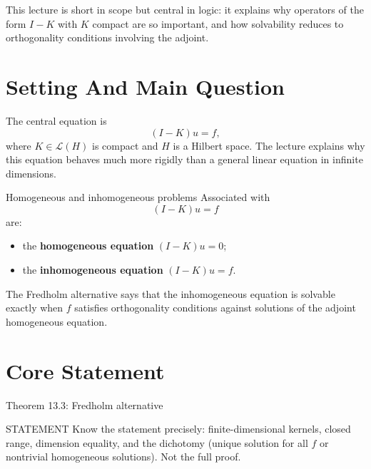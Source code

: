 \documentclass[header={Lecture 9 Exam Study Notes}]{study-note}
\begin{document}

\vspace{0.8em}

\begin{focusbox}
This lecture is short in scope but central in logic: it explains why operators of the form $I-K$ with $K$ compact are so important, and how solvability reduces to orthogonality conditions involving the adjoint.
\end{focusbox}

\tableofcontents

\section{Setting And Main Question}

\begin{focusbox}
The central equation is
\[
(I-K)u=f,
\]
where $K\in\mathcal L(H)$ is compact and $H$ is a Hilbert space. The lecture explains why this equation behaves much more rigidly than a general linear equation in infinite dimensions.
\end{focusbox}

\begin{defbox}{Homogeneous and inhomogeneous problems}
Associated with
\[
(I-K)u=f
\]
are:
\begin{itemize}
\item the \textbf{homogeneous equation} $(I-K)u=0$;
\item the \textbf{inhomogeneous equation} $(I-K)u=f$.
\end{itemize}
The Fredholm alternative says that the inhomogeneous equation is solvable exactly when $f$ satisfies orthogonality conditions against solutions of the adjoint homogeneous equation.
\end{defbox}

\section{Core Statement}

\begin{thmbox}{Theorem 13.3: Fredholm alternative}
\thmFredholmAlternative
\end{thmbox}

\begin{prooflevelbox}{STATEMENT}
Know the statement precisely: finite-dimensional kernels, closed range, dimension equality, and the dichotomy (unique solution for all $f$ or nontrivial homogeneous solutions). Not the full proof.
\end{prooflevelbox}
\end{document}
